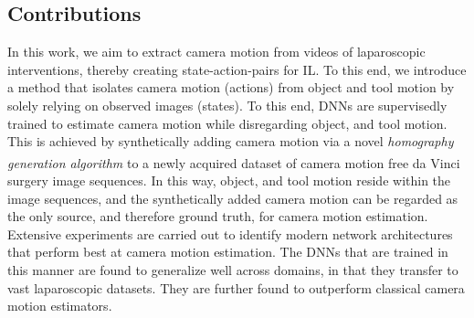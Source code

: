

\subsection{Contributions}

In this work, we aim to extract camera motion from videos of laparoscopic interventions, thereby creating state-action-pairs for IL. To this end, we introduce a method that isolates camera motion (actions) from object and tool motion by solely relying on observed images (states). To this end, DNNs are supervisedly trained to estimate camera motion while disregarding object, and tool motion. This is achieved by synthetically adding camera motion via a novel \textit{homography generation algorithm} to a newly acquired dataset of camera motion free da Vinci\textsuperscript{\textregistered} surgery image sequences. In this way, object, and tool motion reside within the image sequences, and the synthetically added camera motion can be regarded as the only source, and therefore ground truth, for camera motion estimation. Extensive experiments are carried out to identify modern network architectures that perform best at camera motion estimation. The DNNs that are trained in this manner are found to generalize well across domains, in that they transfer to vast laparoscopic datasets. They are further found to outperform classical camera motion estimators.

